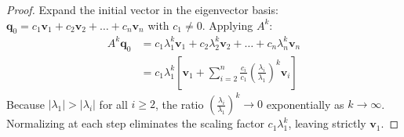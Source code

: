 \begin{proof}
Expand the initial vector in the eigenvector basis: $\mathbf{q}_0 = c_1 \mathbf{v}_1 + c_2 \mathbf{v}_2 + \dots + c_n \mathbf{v}_n$ with $c_1 \ne 0$.
Applying $A^k$:
\begin{align}
A^k \mathbf{q}_0 &= c_1 \lambda_1^k \mathbf{v}_1 + c_2 \lambda_2^k \mathbf{v}_2 + \dots + c_n \lambda_n^k \mathbf{v}_n \\
&= c_1 \lambda_1^k \left[ \mathbf{v}_1 + \sum_{i=2}^n \frac{c_i}{c_1} \left(\frac{\lambda_i}{\lambda_1}\right)^k \mathbf{v}_i \right]
\end{align}
Because $|\lambda_1| > |\lambda_i|$ for all $i \ge 2$, the ratio $\left(\frac{\lambda_i}{\lambda_1}\right)^k \to 0$ exponentially as $k \to \infty$.
Normalizing at each step eliminates the scaling factor $c_1 \lambda_1^k$, leaving strictly $\mathbf{v}_1$.
\end{proof}

